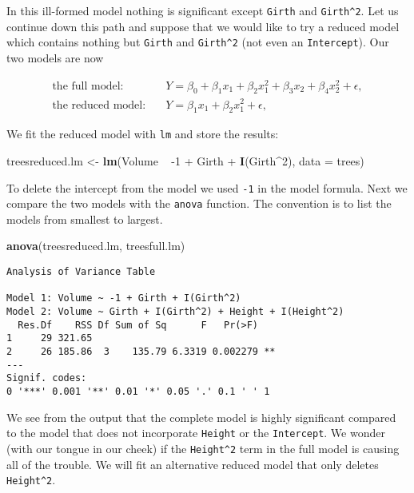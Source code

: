 \documentclass[]{book}
\newenvironment{Shaded}{\begin{snugshade}}{\end{snugshade}}
\newcommand{\KeywordTok}[1]{\textcolor[rgb]{0.13,0.29,0.53}{\textbf{{#1}}}}
\newcommand{\DataTypeTok}[1]{\textcolor[rgb]{0.13,0.29,0.53}{{#1}}}
\newcommand{\DecValTok}[1]{\textcolor[rgb]{0.00,0.00,0.81}{{#1}}}
\newcommand{\StringTok}[1]{\textcolor[rgb]{0.31,0.60,0.02}{{#1}}}
\newcommand{\NormalTok}[1]{{#1}}
\numberwithin{equation}{chapter}
\numberwithin{figure}{chapter}
\theoremstyle{plain}
\theoremstyle{definition}
\theoremstyle{remark}
\theoremstyle{definition}
\theoremstyle{definition}
\theoremstyle{remark}
\begin{document}
In this ill-formed model nothing is significant except \texttt{Girth}
and \texttt{Girth\^{}2}. Let us continue down this path and suppose that
we would like to try a reduced model which contains nothing but
\texttt{Girth} and \texttt{Girth\^{}2} (not even an \texttt{Intercept}).
Our two models are now

\begin{align*} 
\mbox{the full model:} & \quad Y=\beta_{0}+\beta_{1}x_{1}+\beta_{2}x_{1}^{2}+\beta_{3}x_{2}+\beta_{4}x_{2}^{2}+\epsilon,\\
\mbox{the reduced model:} & \quad Y=\beta_{1}x_{1}+\beta_{2}x_{1}^{2}+\epsilon,
\end{align*}

We fit the reduced model with \texttt{lm} and store the results:

\begin{Shaded}
\begin{Highlighting}[]
\NormalTok{treesreduced.lm <-}\StringTok{ }\KeywordTok{lm}\NormalTok{(Volume ~}\StringTok{ }\NormalTok{-}\DecValTok{1} \NormalTok{+}\StringTok{ }\NormalTok{Girth +}\StringTok{ }\KeywordTok{I}\NormalTok{(Girth^}\DecValTok{2}\NormalTok{), }\DataTypeTok{data =} \NormalTok{trees)}
\end{Highlighting}
\end{Shaded}

To delete the intercept from the model we used \texttt{-1} in the model
formula. Next we compare the two models with the \texttt{anova}
function. The convention is to list the models from smallest to largest.

\begin{Shaded}
\begin{Highlighting}[]
\KeywordTok{anova}\NormalTok{(treesreduced.lm, treesfull.lm)}
\end{Highlighting}
\end{Shaded}

\begin{verbatim}
Analysis of Variance Table

Model 1: Volume ~ -1 + Girth + I(Girth^2)
Model 2: Volume ~ Girth + I(Girth^2) + Height + I(Height^2)
  Res.Df    RSS Df Sum of Sq      F   Pr(>F)   
1     29 321.65                                
2     26 185.86  3    135.79 6.3319 0.002279 **
---
Signif. codes:  
0 '***' 0.001 '**' 0.01 '*' 0.05 '.' 0.1 ' ' 1
\end{verbatim}

We see from the output that the complete model is highly significant
compared to the model that does not incorporate \texttt{Height} or the
\texttt{Intercept}. We wonder (with our tongue in our cheek) if the
\texttt{Height\^{}2} term in the full model is causing all of the
trouble. We will fit an alternative reduced model that only deletes
\texttt{Height\^{}2}.
\end{document}
